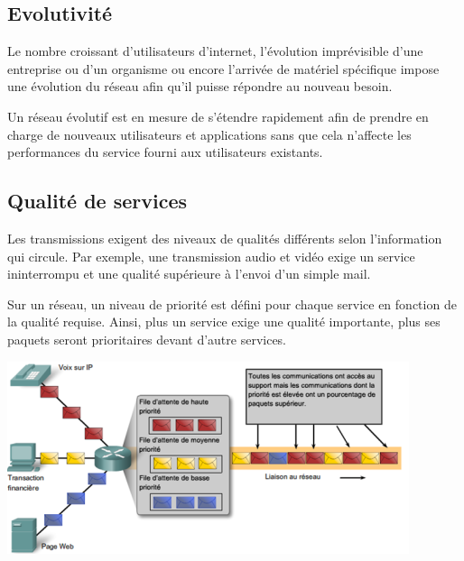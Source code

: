 \documentclass[10pt,fleqn]{article} %
\begin{document}
\subsection{Evolutivité}
Le nombre croissant d'utilisateurs d'internet, l'évolution imprévisible d'une entreprise ou d'un organisme ou encore l'arrivée de matériel spécifique impose une évolution du réseau afin qu'il puisse répondre au nouveau besoin.
\begin{definition}
  Un réseau évolutif est en mesure de s'étendre rapidement afin de prendre en charge de nouveaux utilisateurs et applications sans que cela n'affecte les performances du service fourni aux utilisateurs existants.
\end{definition}

\subsection{Qualité de services}
Les transmissions exigent des niveaux de qualités différents selon l'information qui circule. Par exemple, une transmission audio et vidéo exige un service ininterrompu et une qualité supérieure à l'envoi d'un simple mail.
\begin{aretenir}
  Sur un réseau, un niveau de priorité est défini pour chaque service en fonction de la qualité requise. Ainsi, plus un service exige une qualité importante, plus ses paquets seront prioritaires devant d'autre services.
  \begin{center}
    \includegraphics[width=.8\textwidth]{img/reseau_priorites}
  \end{center}
\end{aretenir}
\end{document}
